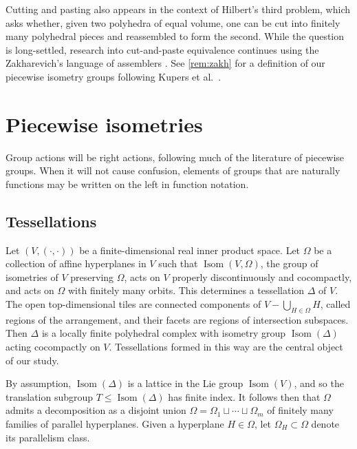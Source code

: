 \documentclass[11pt]{amsart}
\numberwithin{table}{section}
\numberwithin{figure}{section}
\theoremstyle{remark}
\DeclareMathOperator{\Isom}{Isom}
\begin{document}
Cutting and pasting also appears in the context of Hilbert's third
problem, which asks whether, given two polyhedra of equal volume, one
can be cut into finitely many polyhedral pieces and reassembled to
form the second. While the question is long-settled, research into
cut-and-paste equivalence continues using the Zakharevich's language
of assemblers \cite{Zak17}. See \cref{rem:zakh} for a definition of our
piecewise isometry groups following Kupers et al.~\cite{Kup24}.




\section{Piecewise isometries} \label{sec:piecewiseisometries}

Group actions will be right actions, following much of the literature
of piecewise groups. When it will not cause confusion, elements of
groups that are naturally functions may be written on the left in
function notation.

\subsection{Tessellations} \label{sec:tessellations}

Let $(V, (\cdot, \cdot))$ be a finite-dimensional real inner product
space. Let $\Omega$ be a collection of affine hyperplanes in $V$ such
that $\Isom(V,\Omega)$, the group of isometries of $V$ preserving
$\Omega$, acts on $V$ properly discontinuously and cocompactly, and
acts on $\Omega$ with finitely many orbits. 
This determines a tessellation $\Delta$ of $V$. The open top-dimensional tiles are
connected components of $V - \bigcup_{H\in \Omega} H$, called regions
of the arrangement, and their facets are regions of intersection
subspaces. Then $\Delta$ is a locally finite polyhedral complex with
isometry group $\Isom(\Delta)$ acting cocompactly on
$V$. Tessellations formed in this way are the central object of our
study.

By assumption, $\Isom(\Delta)$ is a lattice in the Lie group
$\Isom(V)$, and so the translation subgroup $T\leq \Isom(\Delta)$ has
finite index. It follows then that $\Omega$ admits a decomposition as
a disjoint union $\Omega = \Omega_1 \sqcup \dotsb \sqcup \Omega_m$ of
finitely many families of parallel hyperplanes. Given a hyperplane
$H\in \Omega$, let $\Omega_H \subset \Omega$ denote its parallelism
class.
\end{document}
